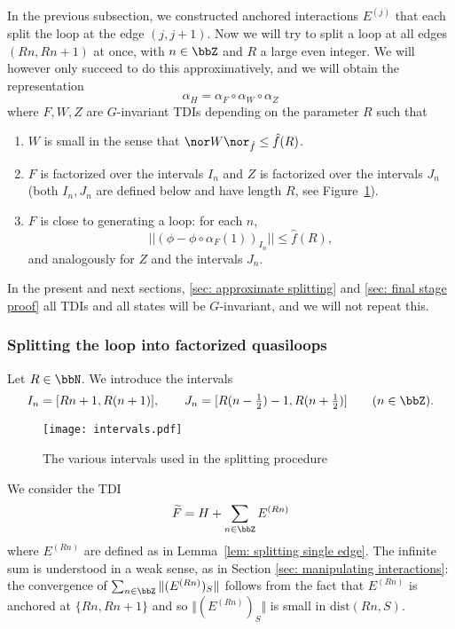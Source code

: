In the previous subsection, we constructed anchored interactions $E^{(j)}$ that each split the loop at the edge $(j,j+1)$. 
Now we will try to split a loop at all edges $(Rn,Rn+1)$ at once, with  $n\in \bbZ$ and $R$ a large even integer.  We will however only succeed to do this approximatively, and we will obtain the representation
$$
\alpha_H=   \alpha_{F} \circ  \alpha_{W} \circ \alpha_Z
$$ 
where $F,W,Z$ are $G$-invariant TDIs depending on the parameter $R$ such that
\begin{enumerate}
	\item $W$ is small in the sense that $\nor W \nor_{\hat{f}}\leq \hat{f}(R)$.
	\item $F$ is factorized over the intervals $I_n$  and $Z$ is factorized over the intervals $J_n$ (both $I_n,J_n$ are defined below and  have length $R$, see Figure~\ref{fig: intervals}).
	\item $F$ is close to generating a loop: for each $n$, 
	$$||(\phi-\phi\circ\alpha_{F}(1))_{I_n}|| \leq \hat{f}(R), $$
	and analogously for $Z$ and the intervals $J_n$.
\end{enumerate}

In the present and next sections, \ref{sec: approximate splitting} and \ref{sec: final stage proof} all TDIs and all states will be $G$-invariant, and we will not repeat this.


\subsubsection{Splitting the loop into factorized quasiloops}\label{sec:factorized quasi-loops}

Let $R\in\bbN$. We introduce the intervals 
$$
I_n= [Rn+1,R(n+1)],\qquad   J_n= [R(n-\tfrac{1}{2})-1,R(n+\tfrac{1}{2})]\qquad(n\in \bbZ).
$$

\begin{figure}[htb]
	\begin{center}
		\texttt{[image: intervals.pdf]}
		\caption{The various intervals used in the splitting procedure}
		\label{fig: intervals}
	\end{center}
\end{figure}

We consider  the TDI 
\begin{equation}\label{F tilde}
\widetilde F=H+\sum_{n \in \bbZ} E^{(Rn)}
\end{equation}
where $E^{(Rn)}$ are defined as in Lemma~\ref{lem: splitting single edge}. The infinite sum is understood in a weak sense, as in Section \ref{sec: manipulating interactions}: the convergence of $\sum_{n \in \bbZ} \Vert (E^{(Rn)})_S\Vert$ follows from the fact that $E^{(Rn)}$ is anchored at $\{Rn,Rn+1\}$ and so $\Vert (E^{(Rn)})_S\Vert$ is small in $\mathrm{dist}(Rn,S)$.

